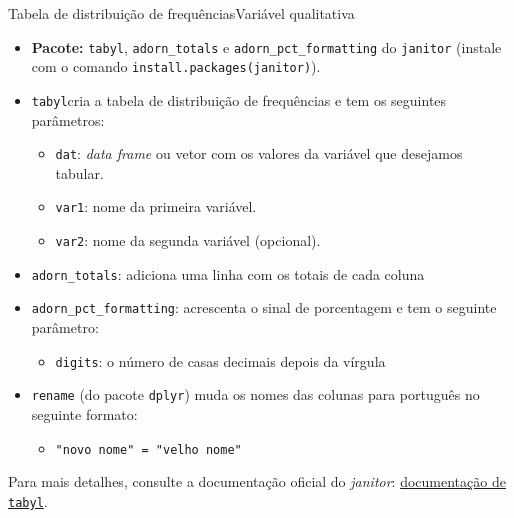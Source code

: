 \documentclass[
  10pt,
  ignorenonframetext,
]{beamer}
\providecommand{\tightlist}{%
  \setlength{\itemsep}{0pt}\setlength{\parskip}{0pt}}
\begin{document}
\begin{frame}[fragile]{Tabela de distribuição de
frequências\newline Variável qualitativa}
\protect\hypertarget{tabela-de-distribuiuxe7uxe3o-de-frequuxeanciasvariuxe1vel-qualitativa}{}
\begin{itemize}
\tightlist
\item
  \textbf{Pacote:} \texttt{tabyl}, \texttt{adorn\_totals} e
  \texttt{adorn\_pct\_formatting} do \texttt{janitor} (instale com o
  comando
  \texttt{install.packages(\textquotesingle{}janitor\textquotesingle{})}).
\item
  \texttt{tabyl}cria a tabela de distribuição de frequências e tem os
  seguintes parâmetros:

  \begin{itemize}
  \tightlist
  \item
    \texttt{dat}: \emph{data frame} ou vetor com os valores da variável
    que desejamos tabular.
  \item
    \texttt{var1}: nome da primeira variável.
  \item
    \texttt{var2}: nome da segunda variável (opcional).
  \end{itemize}
\item
  \texttt{adorn\_totals}: adiciona uma linha com os totais de cada
  coluna
\item
  \texttt{adorn\_pct\_formatting}: acrescenta o sinal de porcentagem e
  tem o seguinte parâmetro:

  \begin{itemize}
  \tightlist
  \item
    \texttt{digits}: o número de casas decimais depois da vírgula
  \end{itemize}
\item
  \texttt{rename} (do pacote \texttt{dplyr}) muda os nomes das colunas
  para português no seguinte formato:

  \begin{itemize}
  \tightlist
  \item
    \texttt{"novo\ nome"\ =\ "velho\ nome"}
  \end{itemize}
\end{itemize}

Para mais detalhes, consulte a documentação oficial do \emph{janitor}:
\href{https://cran.r-project.org/web/packages/janitor/janitor.pdf}{documentação
de \texttt{tabyl}}.
\end{frame}
\end{document}

